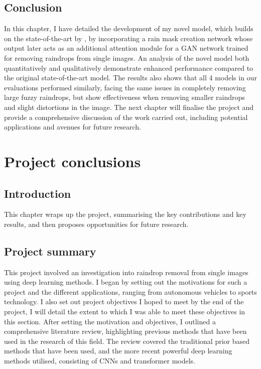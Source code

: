 \documentclass[11pt]{ociamthesis}  %
\begin{document}
\section{Conclusion}
In this chapter, I have detailed the development of my novel model, which builds on the state-of-the-art by \cite{Kwon}, by incorporating a rain mask creation network whose output later acts as an additional attention module for a GAN network trained for removing raindrops from single images. An analysis of the novel model both quantitatively and qualitatively demonstrate enhanced performance compared to the original state-of-the-art model. The results also shows that all 4 models in our evaluations performed similarly, facing the same issues in completely removing large fuzzy raindrops, but show effectiveness when removing smaller raindrops and slight distortions in the image. The next chapter will finalise the project and provide a comprehensive discussion of the work carried out, including potential applications and avenues for future research. 

\chapter{Project conclusions}
\section{Introduction}
This chapter wraps up the project, summarising the key contributions and key results, and then proposes opportunities for future research.

\section{Project summary}
This project involved an investigation into raindrop removal from single images using deep learning methods. I began by setting out the motivations for such a project and the different applications, ranging from autonomous vehicles to sports technology. I also set out project objectives I hoped to meet by the end of the project, I will detail the extent to which I was able to meet these objectives in this section. After setting the motivation and objectives, I outlined a comprehensive literature review, highlighting previous methods that have been used in the research of this field. The review covered the traditional prior based methods that have been used, and the more recent powerful deep learning methods utilised, consisting of CNNs and transformer models.
\end{document}
